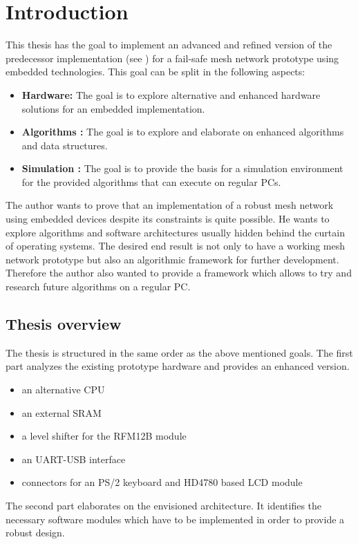 \chapter{Introduction}
This thesis has the goal to implement an advanced and refined version of the predecessor implementation (see \cite{korniowski}) for a fail-safe mesh network prototype using embedded technologies. This goal can be split in the following aspects:
\begin{itemize}
\item \textbf{Hardware: } The goal is to explore alternative and enhanced hardware solutions for an embedded implementation.
\item \textbf{Algorithms :} The goal is to explore and elaborate on enhanced algorithms and data structures.
\item \textbf{Simulation :} The goal is to provide the basis for a simulation environment for the provided algorithms that can execute on regular PCs.
\end{itemize}

The author wants to prove that an implementation of a robust mesh network using embedded devices despite its constraints is quite possible. He wants to explore algorithms and software architectures usually hidden behind the curtain of operating systems.
The desired end result is not only to have a working mesh network prototype but also an algorithmic framework for further development. Therefore the author also wanted to provide a framework which allows to try and research future algorithms on a regular PC.
\section{Thesis overview}
The thesis is structured in the same order as the above mentioned goals. The first part analyzes the existing prototype hardware and provides an enhanced version.
\begin{itemize}
\item an alternative CPU
\item an external SRAM
\item a level shifter for the RFM12B module
\item an UART-USB interface
\item connectors for an PS/2 keyboard and HD4780 based LCD module
\end{itemize}

The second part elaborates on the envisioned architecture. It identifies the necessary software modules which have to be implemented in order to provide a robust design.

